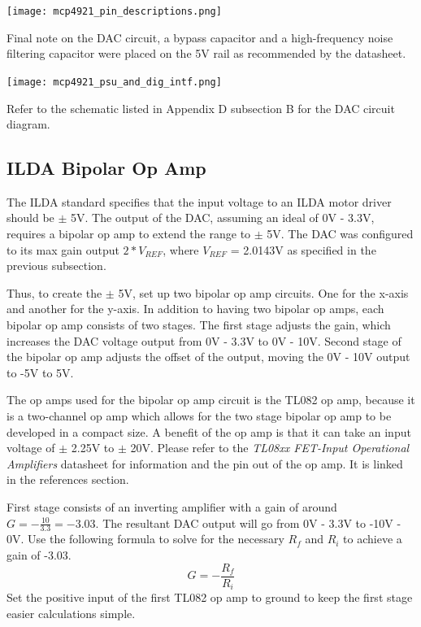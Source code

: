 \documentclass[journal]{IEEEtran}
\begin{document}
    \texttt{[image: mcp4921\_pin\_descriptions.png]}

    Final note on the DAC circuit, a bypass capacitor and a high-frequency noise filtering capacitor were placed on the 5V rail as recommended by the datasheet. \newline

    \texttt{[image: mcp4921\_psu\_and\_dig\_intf.png]}

    Refer to the schematic listed in Appendix D subsection B for the DAC circuit diagram.
    
    \subsection{ILDA Bipolar Op Amp}

    The ILDA standard specifies that the input voltage to an ILDA motor driver should be $\pm$ 5V.
    The output of the DAC, assuming an ideal of 0V - 3.3V, requires a bipolar op amp to extend the range to $\pm$ 5V.
    The DAC was configured to its max gain output $2 * V_{REF}$, where $V_{REF}$ = 2.0143V as specified in the previous subsection.
    
    Thus, to create the $\pm$ 5V, set up two bipolar op amp circuits.
    One for the x-axis and another for the y-axis.
    In addition to having two bipolar op amps, each bipolar op amp consists of two stages.
    The first stage adjusts the gain, which increases the DAC voltage output from 0V - 3.3V to 0V - 10V.
    Second stage of the bipolar op amp adjusts the offset of the output, moving the 0V - 10V output to -5V to 5V.

    The op amps used for the bipolar op amp circuit is the TL082 op amp, because it is a two-channel op amp which allows for the two stage bipolar op amp to be developed in a compact size.
    A benefit of the op amp is that it can take an input voltage of $\pm$ 2.25V to $\pm$ 20V.
    Please refer to the \emph{TL08xx FET-Input Operational Amplifiers} datasheet for information and the pin out of the op amp. It is linked in the references section.

    First stage consists of an inverting amplifier with a gain of around $G = - \frac{10}{3.3} = -3.03$.
    The resultant DAC output will go from 0V - 3.3V to -10V - 0V.
    Use the following formula to solve for the necessary $R_{f}$ and $R_{i}$ to achieve a gain of -3.03.
    $$ G = -\frac{R_{f}}{R_{i}}$$
    Set the positive input of the first TL082 op amp to ground to keep the first stage easier calculations simple.
\end{document}
